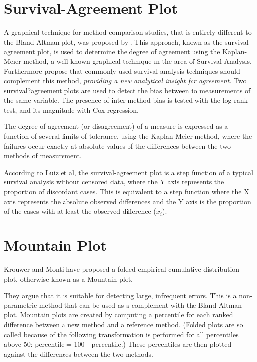 \documentclass[12pt, a4paper]{report}
\theoremstyle{plain}
\theoremstyle{definition}
\theoremstyle{remark}
\begin{document}
	\section{Survival-Agreement Plot}
	A graphical technique for method comparison studies, that is entirely different to the Bland-Altman plot, was proposed by \citet{luiz}. This approach, known as the survival-agreement plot, is used to determine the degree of agreement using the Kaplan-Meier method, a well known graphical technique in the area of Survival Analysis. Furthermore \citet{luiz} propose that commonly used survival analysis techniques should complement this method,\textit{ providing a new analytical insight
		for agreement}. Two survival?agreement plots are used to detect the bias between to measurements of the same variable. The presence of inter-method bias is tested with the log-rank test, and its magnitude with Cox regression.
	
	
	The degree of agreement (or disagreement) of a measure is expressed as a function of several limits of tolerance, using the Kaplan-Meier method, where the failures occur exactly at absolute values of the differences between the two methods of measurement. 
	
	According to Luiz et al, the survival-agreement plot is a step function of a typical survival analysis without censored data, where the Y axis represents the proportion of discordant cases. This is equivalent to a step function where the X axis represents the absolute  observed differences and the Y axis is the proportion of the cases with at least the observed 
	difference ($x_i$). 
	
	
	
	
	
	
	
	
	\section{Mountain Plot} Krouwer and Monti have proposed a folded empirical cumulative distribution plot, otherwise known as a Mountain plot.
	
	They argue that it is suitable for detecting large, infrequent errors. This is a non-parametric method that can be used as a complement with the Bland Altman plot.  Mountain plots are created by computing a percentile
	for each ranked difference between a new method and a reference method. (Folded plots are so called because of the following transformation is performed for all percentiles above 50: percentile = 100 - percentile.) These percentiles are then plotted against the differences between the two methods.
	
\end{document}
